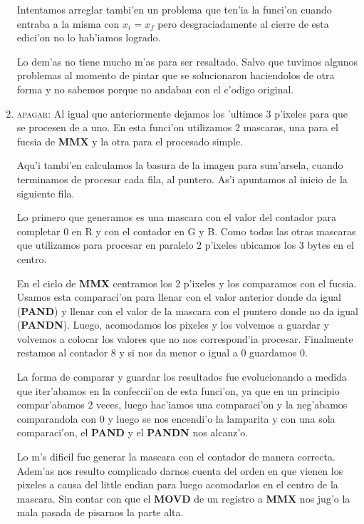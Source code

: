 \begin{enumerate}
Intentamos arreglar tambi'en un problema que ten'ia la funci'on cuando entraba
a la misma con $x_i = x_f$ pero desgraciadamente al cierre de esta edici'on no
lo hab'iamos logrado.

Lo dem'as no tiene mucho m'as para ser resaltado. Salvo que tuvimos algunos
problemas al momento de pintar que se solucionaron haciendolos de otra forma y
no sabemos porque no andaban con el c'odigo original.

\item \textsc{apagar}:
Al igual que anteriormente dejamos los 'ultimos 3 p'ixeles para que se procesen
de a uno. En esta funci'on utilizamos 2 mascaras, una para el fucsia de
\textbf{MMX} y la otra para el procesado simple.

Aqu'i tambi'en calculamos la basura de la imagen para sum'arsela, cuando terminamos
de procesar cada fila, al puntero. As'i apuntamos al inicio de la siguiente fila.

Lo primero que generamos es una mascara con el valor del contador para
completar 0 en R y con el contador en G y B. Como todas las otras mascaras que
utilizamos para procesar en paralelo 2 p'ixeles ubicamos los 3 bytes en el
centro.

En el ciclo de \textbf{MMX} centramos los 2 p'ixeles y los comparamos con el fucsia.
Usamos esta comparaci'on para llenar con el valor anterior donde da igual
(\textbf{PAND}) y llenar con el valor de la mascara con el puntero donde no da
igual (\textbf{PANDN}). Luego, acomodamos los pixeles y los volvemos a guardar
y volvemos a colocar los valores que no nos correspond'ia procesar.
Finalmente restamos al contador 8 y si nos da menor o igual a 0 guardamos 0.

La forma de comparar y guardar los resultados fue evolucionando a medida que
iter'abamos en la confeccii'on de esta funci'on, ya que en un principio
compar'abamos 2 veces, luego hac'iamos una comparaci'on y la neg'abamos
comparandola con 0 y luego se nos encendi'o la lamparita y con una sola
comparaci'on, el \textbf{PAND} y el \textbf{PANDN} nos alcanz'o.

Lo m's dificil fue generar la mascara con el contador de manera correcta.
Adem'as  nos resulto complicado darnos cuenta del orden en que vienen los
pixeles a causa del little endian para luego acomodarlos en el centro de la
mascara. Sin contar con que el \textbf{MOVD} de un registro a \textbf{MMX} nos
jug'o la mala pasada de pisarnos la parte alta.

\end{enumerate}

